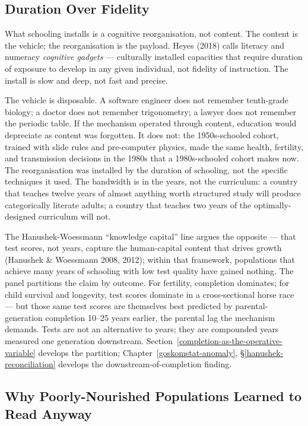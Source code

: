 \documentclass[12pt,letterpaper]{article}
\begin{document}
\subsection{Duration Over Fidelity}\label{duration-over-fidelity}

What schooling installs is a cognitive reorganisation, not content.
The content is the vehicle; the reorganisation is the payload. Heyes
(2018) calls literacy and numeracy \emph{cognitive gadgets} ---
culturally installed capacities that require duration of exposure to
develop in any given individual, not fidelity of instruction. The
install is slow and deep, not fast and precise.

The vehicle is disposable. A software engineer does not remember
tenth-grade biology; a doctor does not remember trigonometry; a
lawyer does not remember the periodic table. If the mechanism
operated through content, education would depreciate as content was
forgotten. It does not: the 1950s-schooled cohort, trained with slide
rules and pre-computer physics, made the same health, fertility, and
transmission decisions in the 1980s that a 1980s-schooled cohort
makes now. The reorganisation was installed by the duration of
schooling, not the specific techniques it used. The bandwidth is in
the years, not the curriculum: a country that teaches twelve years
of almost anything worth structured study will produce categorically
literate adults; a country that teaches two years of the
optimally-designed curriculum will not.

The Hanushek-Woessmann ``knowledge capital'' line argues the
opposite --- that test scores, not years, capture the human-capital
content that drives growth (Hanushek \& Woessmann 2008, 2012); within
that framework, populations that achieve many years of schooling with
low test quality have gained nothing. The panel partitions the claim
by outcome. For fertility, completion dominates; for child survival
and longevity, test scores dominate in a cross-sectional horse race
--- but those same test scores are themselves best predicted by
parental-generation completion 10--25 years earlier, the parental lag
the mechanism demands. Tests are not an alternative to years; they
are compounded years measured one generation downstream.
Section~\ref{completion-as-the-operative-variable} develops the
partition; Chapter~\ref{goskomstat-anomaly},
\S\ref{hanushek-reconciliation} develops the
downstream-of-completion finding.

\subsection{Why Poorly-Nourished Populations Learned to Read Anyway}\label{why-poorly-nourished-populations-learned-to-read}
\end{document}
